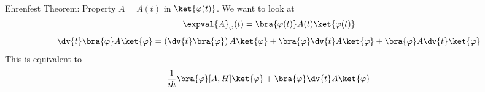 \documentclass[a4paper,twoside,master.tex]{subfiles}
\begin{document}
\begin{theorem}
    Ehrenfest Theorem:
    Property $ A = A(t) $ in $ \ket{\varphi(t)} $. We want to look at
    \begin{equation}
        \expval{A}_{\varphi}(t) = \bra{\varphi(t)} A(t) \ket{\varphi(t)}
    \end{equation}
    \begin{equation}
        \dv{t} \bra{\varphi} A \ket{\varphi} = \left( \dv{t} \bra{\varphi} \right)A \ket{\varphi} + \bra{\varphi} \dv{t}A \ket{\varphi} + \bra{\varphi} A \dv{t} \ket{\varphi}
    \end{equation}
    This is equivalent to
    \begin{equation}
        \frac{1}{\imath\hbar} \bra{\varphi} [A, H] \ket{\varphi} + \bra{\varphi} \dv{t}A \ket{\varphi}
    \end{equation}
\end{theorem}
\end{document}

